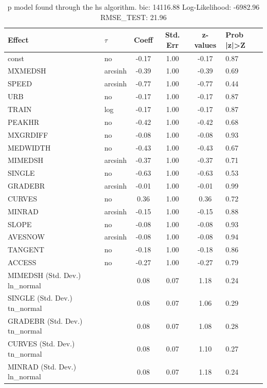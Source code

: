 \begin{table}
	\caption{p model found through the hs algorithm. bic: 14116.88 Log-Likelihood: -6982.96 RMSE_TEST: 21.96}
	\begin{center}
		\begin{tabular}{|l|l|c|c|c|l|}
			\hline
			Effect & $\tau$ & Coeff & Std. Err & z-values & Prob |z|>Z \\
			\hline
			const & no & -0.17 & 1.00 & -0.17 & 0.87 \\
			\hline
			MXMEDSH & arcsinh & -0.39 & 1.00 & -0.39 & 0.69 \\
			\hline
			SPEED & arcsinh & -0.77 & 1.00 & -0.77 & 0.44 \\
			\hline
			URB & no & -0.17 & 1.00 & -0.17 & 0.87 \\
			\hline
			TRAIN & log & -0.17 & 1.00 & -0.17 & 0.87 \\
			\hline
			PEAKHR & no & -0.42 & 1.00 & -0.42 & 0.68 \\
			\hline
			MXGRDIFF & no & -0.08 & 1.00 & -0.08 & 0.93 \\
			\hline
			MEDWIDTH & no & -0.43 & 1.00 & -0.43 & 0.67 \\
			\hline
			MIMEDSH & arcsinh & -0.37 & 1.00 & -0.37 & 0.71 \\
			\hline
			SINGLE & no & -0.63 & 1.00 & -0.63 & 0.53 \\
			\hline
			GRADEBR & arcsinh & -0.01 & 1.00 & -0.01 & 0.99 \\
			\hline
			CURVES & no & 0.36 & 1.00 & 0.36 & 0.72 \\
			\hline
			MINRAD & arcsinh & -0.15 & 1.00 & -0.15 & 0.88 \\
			\hline
			SLOPE & no & -0.08 & 1.00 & -0.08 & 0.93 \\
			\hline
			AVESNOW & arcsinh & -0.08 & 1.00 & -0.08 & 0.94 \\
			\hline
			TANGENT & no & -0.18 & 1.00 & -0.18 & 0.86 \\
			\hline
			ACCESS & no & -0.27 & 1.00 & -0.27 & 0.79 \\
			\hline
			MIMEDSH (Std. Dev.) ln_normal &  & 0.08 & 0.07 & 1.18 & 0.24 \\
			\hline
			SINGLE (Std. Dev.) tn_normal &  & 0.08 & 0.07 & 1.06 & 0.29 \\
			\hline
			GRADEBR (Std. Dev.) tn_normal &  & 0.08 & 0.07 & 1.08 & 0.28 \\
			\hline
			CURVES (Std. Dev.) tn_normal &  & 0.08 & 0.07 & 1.10 & 0.27 \\
			\hline
			MINRAD (Std. Dev.) ln_normal &  & 0.08 & 0.07 & 1.18 & 0.24 \\

\end{tabular}
\end{center}
\end{table}
